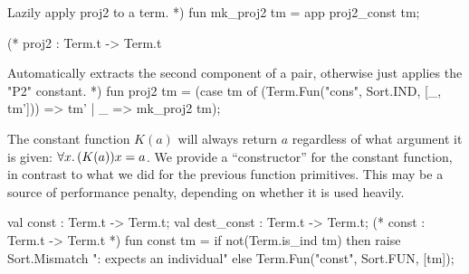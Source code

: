 Lazily apply proj2 to a term. *)
fun mk_proj2 tm = app proj2_const tm;

(* proj2 : Term.t -> Term.t

Automatically extracts the second component of a pair,
otherwise just applies the "P2" constant. *)
fun proj2 tm =
 (case tm of
   (Term.Fun("cons", Sort.IND, [_, tm'])) => tm'
   | _ => mk_proj2 tm);
\eatline
{}\nwendcode{}\nwdocspar
\begin{node}
The constant function $K(a)$ will always return $a$ regardless of what
argument it is given: $\forall x\ldotp (K(a))x=a$. We provide a
``constructor'' for the constant function, in contrast to what we did
for the previous function primitives. This may be a source of
performance penalty, depending on whether it is used heavily.
\end{node}

\nwenddocs{}\plusendmoddef\nwstartdeflinemarkup{}\nwenddeflinemarkup
val const : Term.t -> Term.t;
val dest_const : Term.t -> Term.t;
\nwendcode{}\nwdocspar
\nwenddocs{}\endmoddef\nwstartdeflinemarkup{}\nwenddeflinemarkup
(* const : Term.t -> Term.t *)
fun const tm =
  if not(Term.is_ind tm)
  then raise Sort.Mismatch ": expects an individual"
  else Term.Fun("const", Sort.FUN, [tm]);

